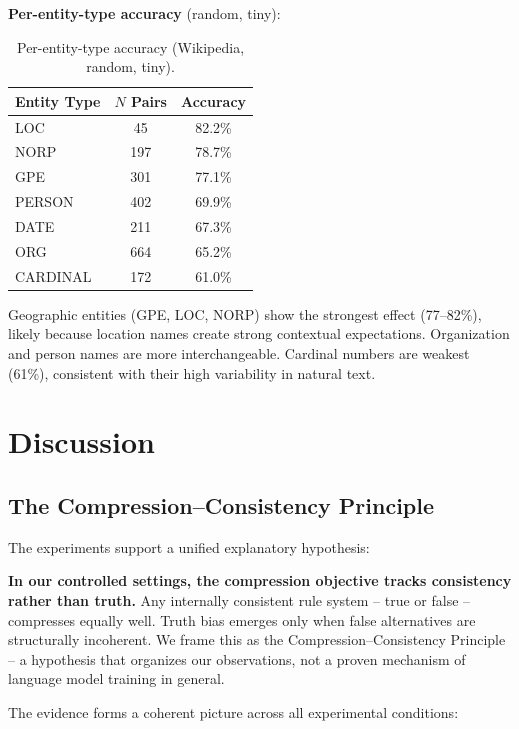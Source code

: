 \documentclass[10pt]{article} %
\begin{document}
\textbf{Per-entity-type accuracy} (random, tiny):

\begin{table}[t]
\caption{Per-entity-type accuracy (Wikipedia, random, tiny).}
\label{tab:wiki_entity}
\centering
\begin{tabular}{lcc}
\toprule
Entity Type & $N$ Pairs & Accuracy \\
\midrule
LOC & 45 & 82.2\% \\
NORP & 197 & 78.7\% \\
GPE & 301 & 77.1\% \\
PERSON & 402 & 69.9\% \\
DATE & 211 & 67.3\% \\
ORG & 664 & 65.2\% \\
CARDINAL & 172 & 61.0\% \\
\bottomrule
\end{tabular}
\end{table}

Geographic entities (GPE, LOC, NORP) show the strongest effect (77--82\%), likely because location names create strong contextual expectations. Organization and person names are more interchangeable. Cardinal numbers are weakest (61\%), consistent with their high variability in natural text.

\section{Discussion}
\label{sec:discussion}

\subsection{The Compression--Consistency Principle}

The experiments support a unified explanatory hypothesis:

\textbf{In our controlled settings, the compression objective tracks consistency rather than truth.} Any internally consistent rule system -- true or false -- compresses equally well. Truth bias emerges only when false alternatives are structurally incoherent. We frame this as the Compression--Consistency Principle -- a hypothesis that organizes our observations, not a proven mechanism of language model training in general.

The evidence forms a coherent picture across all experimental conditions:
\end{document}
